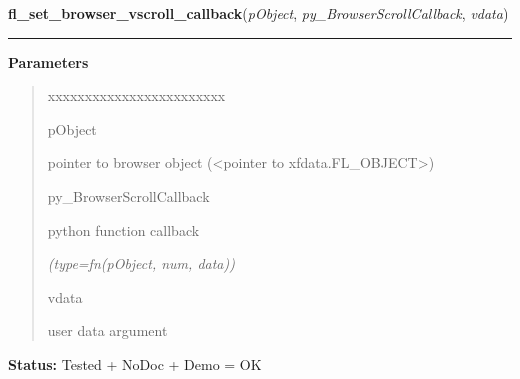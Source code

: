 \hspace{.8\funcindent}\begin{boxedminipage}{\funcwidth}

    \raggedright \textbf{fl\_set\_browser\_vscroll\_callback}(\textit{pObject}, \textit{py\_BrowserScrollCallback}, \textit{vdata})

    \vspace{-1.5ex}

    \rule{\textwidth}{0.5\fboxrule}
\setlength{\parskip}{2ex}
\setlength{\parskip}{1ex}
      \textbf{Parameters}
      \vspace{-1ex}

      \begin{quote}
        \begin{Ventry}{xxxxxxxxxxxxxxxxxxxxxxxx}

          \item[pObject]

          pointer to browser object ({\textless}pointer to 
          xfdata.FL\_OBJECT{\textgreater})

          \item[py\_BrowserScrollCallback]

          python function callback

            {\it (type=fn(pObject, num, data))}

          \item[vdata]

          user data argument

        \end{Ventry}

      \end{quote}

\textbf{Status:} Tested + NoDoc + Demo = OK



    \end{boxedminipage}

    \label{xformslib:library:fl_get_browser_line_yoffset}

    \vspace{0.5ex}

